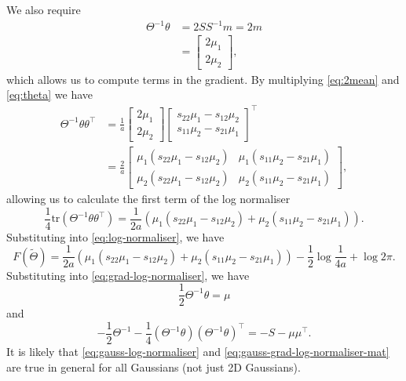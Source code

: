 \documentclass[a4paper]{article}
\newcommand{\thetaall}{\tilde{\Theta}}
\newcommand{\vect}[2]{\begin{bmatrix} #1 \\ #2 \end{bmatrix}}
\newcommand{\mat}[4]{\begin{bmatrix} #1 & #2\\ #3& #4 \end{bmatrix}}
\newcommand{\trace}{\mathrm{tr}}
\begin{document}
We also require
\begin{align}
  \Theta^{-1}\theta &= 2SS^{-1}m = 2m\nonumber\\
  &=\vect{2\mu_1}{2\mu_2}\label{eq:2mean},
\end{align}
which allows us to compute terms in the gradient. By multiplying
\eqref{eq:2mean} and \eqref{eq:theta} we have
\begin{align*}
  \Theta^{-1}\theta\theta^\top &= \frac{1}{a}\vect{2\mu_1}{2\mu_2}
  \vect{s_{22}\mu_1 - s_{12}\mu_2}{s_{11}\mu_2 - s_{21}\mu_1}^\top\\
  &=\frac{2}{a}\mat{\mu_1(s_{22}\mu_1 - s_{12}\mu_2)}{\mu_1(s_{11}\mu_2 - s_{21}\mu_1)}{\mu_2(s_{22}\mu_1 - s_{12}\mu_2)}{\mu_2(s_{11}\mu_2 - s_{21}\mu_1)},
\end{align*}
allowing us to calculate the first term of the log normaliser
\[
  \frac{1}{4}\trace(\Theta^{-1} \theta\theta^\top)= \frac{1}{2a}
  \left(\mu_1(s_{22}\mu_1 - s_{12}\mu_2) + \mu_2(s_{11}\mu_2 - s_{21}\mu_1)\right).
\]
Substituting into \eqref{eq:log-normaliser}, we have
\begin{equation}
  \label{eq:gauss-log-normaliser}
  F(\thetaall) = \frac{1}{2a}
  \left(\mu_1(s_{22}\mu_1 - s_{12}\mu_2) + \mu_2(s_{11}\mu_2 - s_{21}\mu_1)\right)
  - \frac{1}{2} \log \frac{1}{4a} + \log 2\pi.
\end{equation}
Substituting into \eqref{eq:grad-log-normaliser}, we have
\begin{equation}
  \label{eq:gauss-grad-log-normaliser-vec}
  \frac{1}{2}\Theta^{-1}\theta = \mu
\end{equation}
and
\begin{equation}
  \label{eq:gauss-grad-log-normaliser-mat}
  -\frac{1}{2} \Theta^{-1} - \frac{1}{4} (\Theta^{-1}\theta)(\Theta^{-1}\theta)^\top
  =
  - S - \mu\mu^\top.
\end{equation}
It is likely that \eqref{eq:gauss-log-normaliser} and \eqref{eq:gauss-grad-log-normaliser-mat}
are true in general for all Gaussians (not just 2D Gaussians).



\end{document}
